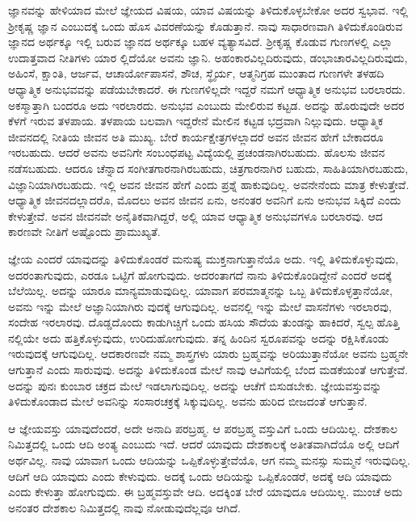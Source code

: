 ಜ್ಞಾನವನ್ನು ಹೇಳಿಯಾದ ಮೇಲೆ ಜ್ಞೇಯದ ವಿಷಯ, ಯಾವ ವಿಷಯನ್ನು ತಿಳಿದುಕೊಳ್ಳಬೇಕೋ ಅದರ ಸ್ವಭಾವ. ಇಲ್ಲಿ ಶ್ರೀಕೃಷ್ಣ ಜ್ಞಾನ ಎಂಬುದಕ್ಕೆ ಒಂದು ಹೊಸ ವಿವರಣೆಯನ್ನು ಕೊಡುತ್ತಾನೆ. ನಾವು ಸಾಧಾರಣವಾಗಿ ತಿಳಿದುಕೊಂಡಿರುವ ಜ್ಞಾನದ ಅರ್ಥಕ್ಕೂ ಇಲ್ಲಿ ಬರುವ ಜ್ಞಾನದ ಅರ್ಥಕ್ಕೂ ಬಹಳ ವ್ಯತ್ಯಾಸವಿದೆ. ಶ್ರೀಕೃಷ್ಣ ಕೊಡುವ ಗುಣಗಳಲ್ಲಿ ಎಲ್ಲಾ ಉದಾತ್ತವಾದ ನೀತಿಗಳು ಯಾರ ಲ್ಲಿದೆಯೋ ಅವನು ಜ್ಞಾನಿ. ಅಹಂಕಾರವಿಲ್ಲದಿರುವುದು, ಡಂಭಾಚಾರವಿಲ್ಲದಿರುವುದು, ಅಹಿಂಸೆ, ಕ್ಷಾಂತಿ, ಆರ್ಜವ, ಆಚಾರ್ಯೋಪಾಸನೆ, ಶೌಚ, ಸ್ಥೈರ್ಯ, ಆತ್ಮನಿಗ್ರಹ ಮುಂತಾದ ಗುಣಗಳೇ ತಳಹದಿ ಆಧ್ಯಾತ್ಮಿಕ ಅನುಭವವನ್ನು ಪಡೆಯಬೇಕಾದರೆ. ಈ ಗುಣಗಳಿಲ್ಲದೇ ಇದ್ದರೆ ನಮಗೆ ಆಧ್ಯಾತ್ಮಿಕ ಅನುಭವ ಬರಲಾರದು. ಅಕಸ್ಮಾತ್ತಾಗಿ ಬಂದರೂ ಅದು ಇರಲಾರದು. ಅನುಭವ ಎಂಬುದು ಮೇಲಿರುವ ಕಟ್ಟಡ. ಅದನ್ನು ಹೊರುವುದೇ ಅದರ ಕೆಳಗೆ ಇರುವ ತಳಪಾಯ. ತಳಪಾಯ ಬಲವಾಗಿ ಇದ್ದರೇನೆ ಮೇಲಿನ ಕಟ್ಟಡ ಭದ್ರವಾಗಿ ನಿಲ್ಲುವುದು. ಆಧ್ಯಾತ್ಮಿಕ ಜೀವನದಲ್ಲಿ ನೀತಿಯ ಜೀವನ ಅತಿ ಮುಖ್ಯ. ಬೇರೆ ಕಾರ್ಯಕ್ಷೇತ್ರಗಳಲ್ಲಾದರೆ ಅವನ ಜೀವನ ಹೇಗೆ ಬೇಕಾದರೂ ಇರಬಹುದು. ಆದರೆ ಅವನು ಅವನಿಗೇ ಸಂಬಂಧಪಟ್ಟ ವಿದ್ಯೆಯಲ್ಲಿ ಪ್ರಚಂಡನಾಗಿರಬಹುದು. ಹೊಲಸು ಜೀವನ ನಡೆಸಬಹುದು. ಆದರೂ ಚೆನ್ನಾದ ಸಂಗೀತಗಾರನಾಗಿರಬಹುದು, ಚಿತ್ರಗಾರನಾಗಿರ ಬಹುದು, ಸಾಹಿತಿಯಾಗಿರಬಹುದು, ವಿಜ್ಞಾನಿಯಾಗಿರಬಹುದು. ಇಲ್ಲಿ ಅವನ ಜೀವನ ಹೇಗೆ ಎಂದು ಪ್ರಶ್ನೆ ಹಾಕುವುದಿಲ್ಲ. ಅವನೇನೆಂದು ಮಾತ್ರ ಕೇಳುತ್ತೇವೆ. ಆಧ್ಯಾತ್ಮಿಕ ಜೀವನದಲ್ಲಾದರೊ, ಮೊದಲು ಅವನ ಜೀವನ ಏನು, ಅನಂತರ ಅವನಿಗೆ ಏನು ಅನುಭವ ಸಿಕ್ಕಿದೆ ಎಂದು ಕೇಳುತ್ತೇವೆ. ಅವನ ಜೀವನವೇ ಅನೈತಿಕವಾಗಿದ್ದರೆ, ಅಲ್ಲಿ ಯಾವ ಆಧ್ಯಾತ್ಮಿಕ ಅನುಭವಗಳೂ ಬರಲಾರವು. ಆದ ಕಾರಣವೇ ನೀತಿಗೆ ಅಷ್ಟೊಂದು ಪ್ರಾಮುಖ್ಯತೆ.

ಜ್ಞೇಯ ಎಂದರೆ ಯಾವುದನ್ನು ತಿಳಿದುಕೊಂಡರೆ ಮನುಷ್ಯ ಮುಕ್ತನಾಗುತ್ತಾನೆಯೊ ಅದು. ಇಲ್ಲಿ ತಿಳಿದುಕೊಳ್ಳುವುದು, ಅದರಂತಾಗುವುದು, ಎರಡೂ ಒಟ್ಟಿಗೆ ಹೋಗುವುದು. ಅದರಂತಾಗದೆ ನಾನು ತಿಳಿದುಕೊಂಡಿದ್ದೇನೆ ಎಂದರೆ ಅದಕ್ಕೆ ಬೆಲೆಯಿಲ್ಲ. ಅದನ್ನು ಯಾರೂ ಮಾನ್ಯಮಾಡುವುದಿಲ್ಲ. ಯಾವಾಗ ಪರಮಾತ್ಮನನ್ನು ಒಬ್ಬ ತಿಳಿದುಕೊಳ್ಳತ್ತಾನೆಯೋ, ಅವನು ಇನ್ನು ಮೇಲೆ ಅಜ್ಞಾನಿಯಾಗಿರು ವುದಕ್ಕೆ ಆಗುವುದಿಲ್ಲ. ಅವನಲ್ಲಿ ಇನ್ನು ಮೇಲೆ ವಾಸನೆಗಳು ಇರಲಾರವು, ಸಂದೇಹ ಇರಲಾರವು. ದೊಡ್ಡದೊಂದು ಕಾಡುಗಿಚ್ಚಿಗೆ ಒಂದು ಹಸಿಯ ಸೌದೆಯ ತುಂಡನ್ನು ಹಾಕಿದರೆ, ಸ್ವಲ್ಪ ಹೊತ್ತಿ ನಲ್ಲಿಯೇ ಅದು ಹತ್ತಿಕೊಳ್ಳುವುದು, ಉರಿದುಹೋಗುವುದು. ತನ್ನ ಹಿಂದಿನ ಸ್ವರೂಪವನ್ನು ಅದನ್ನು ರಕ್ಷಿಸಿಕೊಂಡು ಇರುವುದಕ್ಕೆ ಆಗುವುದಿಲ್ಲ. ಆದಕಾರಣವೇ ನಮ್ಮ ಶಾಸ್ತ್ರಗಳು ಯಾರು ಬ್ರಹ್ಮವನ್ನು ಅರಿಯುತ್ತಾನೆಯೋ ಅವನು ಬ್ರಹ್ಮನೇ ಆಗುತ್ತಾನೆ ಎಂದು ಸಾರುವುವು. ಅದನ್ನು ತಿಳಿದುಕೊಂಡ ಮೇಲೆ ನಾವು ಆವಿಗೆಯಲ್ಲಿ ಬೆಂದ ಮಡಕೆಯಂತೆ ಆಗುತ್ತೇವೆ. ಅದನ್ನು ಪುನಃ ಕುಂಬಾರ ಚಕ್ರದ ಮೇಲೆ ಇಡಲಾಗುವುದಿಲ್ಲ. ಅದನ್ನು ಆಚೆಗೆ ಬಿಸುಡಬೇಕು. ಜ್ಞೇಯವಸ್ತುವನ್ನು ತಿಳಿದುಕೊಂಡಾದ ಮೇಲೆ ಅವನಿನ್ನು ಸಂಸಾರಚಕ್ರಕ್ಕೆ ಸಿಕ್ಕುವುದಿಲ್ಲ. ಅವನು ಹುರಿದ ಬೀಜದಂತೆ ಆಗುತ್ತಾನೆ.

ಆ ಜ್ಞೇಯವಸ್ತು ಯಾವುದೆಂದರೆ, ಅದೇ ಅನಾದಿ ಪರಬ್ರಹ್ಮ. ಆ ಪರಬ್ರಹ್ಮ ವಸ್ತುವಿಗೆ ಒಂದು ಆದಿಯಿಲ್ಲ. ದೇಶಕಾಲ ನಿಮಿತ್ತದಲ್ಲಿ ಒಂದು ಆದಿ ಅಂತ್ಯ ಎಂಬುದು ಇದೆ. ಆದರೆ ಯಾವುದು ದೇಶಕಾಲಕ್ಕೆ ಅತೀತವಾಗಿದೆಯೊ ಅಲ್ಲಿ ಆದಿಗೆ ಅರ್ಥವಿಲ್ಲ. ನಾವು ಯಾವಾಗ ಒಂದು ಆದಿಯನ್ನು ಒಪ್ಪಿಕೊಳ್ಳುತ್ತೇವೆಯೊ, ಆಗ ನಮ್ಮ ಮನಸ್ಸು ಸುಮ್ಮನೆ ಇರುವುದಿಲ್ಲ. ಆದಿಗೆ ಆದಿ ಯಾವುದು ಎಂದು ಕೇಳುವುದು. ಅದಕ್ಕೆ ಒಂದು ಆದಿಯನ್ನು ಒಪ್ಪಿಕೊಂಡರೆ, ಅದಕ್ಕೆ ಆದಿ ಯಾವುದು ಎಂದು ಕೇಳುತ್ತಾ ಹೋಗುವುದು. ಈ ಬ್ರಹ್ಮವಸ್ತುವೇ ಆದಿ. ಅದಕ್ಕಿಂತ ಬೇರೆ ಯಾವುದೂ ಆದಿಯಿಲ್ಲ. ಮುಂಚೆ ಅದು ಅನಂತರ ದೇಶಕಾಲ ನಿಮಿತ್ತದಲ್ಲಿ ನಾವು ನೋಡುವುದೆಲ್ಲವೂ ಆಗಿದೆ.

